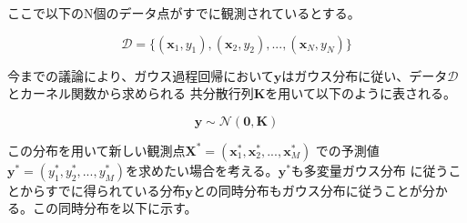 ここで以下のN個のデータ点がすでに観測されているとする。

\begin{equation}
\mathcal{D} = \{(\boldsymbol{x}_{1}, y_{1}), (\boldsymbol{x}_{2}, y_{2}), ..., (\boldsymbol{x}_{N}, y_{N})\}
\end{equation}

今までの議論により、ガウス過程回帰において$\boldsymbol{y}$はガウス分布に従い、データ$\mathcal{D}$とカーネル関数から求められる
共分散行列$\boldsymbol{K}$を用いて以下のように表される。

\begin{equation}
\boldsymbol{y} \sim \mathcal{N}(\boldsymbol{0}, \boldsymbol{K})
\end{equation}

この分布を用いて新しい観測点$\boldsymbol{X}^* = (\boldsymbol{x}_{1}^*, \boldsymbol{x}_{2}^*, ..., \boldsymbol{x}_{M}^*)$
での予測値$\boldsymbol{y}^* = (y_{1}^*, y_{2}^*, ..., y_{M}^*)$を求めたい場合を考える。$\boldsymbol{y}^*$も多変量ガウス分布
に従うことからすでに得られている分布$\boldsymbol{y}$との同時分布もガウス分布に従うことが分かる。この同時分布を以下に示す。

